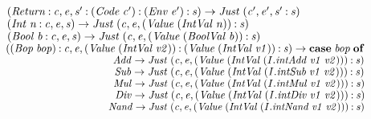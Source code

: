 \documentclass[10pt]{article}
\newcommand{\Conid}[1]{\mathit{#1}}
\newcommand{\Varid}[1]{\mathit{#1}}
\begin{document}
\begin{hscode}
${\hskip4.00em\relax(\Conid{Return}\mathbin{:}\Varid{c},\Varid{e},\Varid{s'}\mathbin{:}(\Conid{Code}\;\Varid{c'})\mathbin{:}(\Conid{Env}\;\Varid{e'})\mathbin{:}\Varid{s})\to \Conid{Just}\;(\Varid{c'},\Varid{e'},\Varid{s'}\mathbin{:}\Varid{s})}$\\
${\hskip4.00em\relax(\Conid{Int}\;\Varid{n}\mathbin{:}\Varid{c},\Varid{e},\Varid{s})\to \Conid{Just}\;(\Varid{c},\Varid{e},(\Conid{Value}\;(\Conid{IntVal}\;\Varid{n}))\mathbin{:}\Varid{s})}$\\
${\hskip4.00em\relax(\Conid{Bool}\;\Varid{b}\mathbin{:}\Varid{c},\Varid{e},\Varid{s})\to \Conid{Just}\;(\Varid{c},\Varid{e},(\Conid{Value}\;(\Conid{BoolVal}\;\Varid{b}))\mathbin{:}\Varid{s})}$\\
${\hskip4.00em\relax((\Conid{Bop}\;\Varid{bop})\mathbin{:}\Varid{c},\Varid{e},(\Conid{Value}\;(\Conid{IntVal}\;\Varid{v2}))\mathbin{:}(\Conid{Value}\;(\Conid{IntVal}\;\Varid{v1}))\mathbin{:}\Varid{s})\to \mathbf{case}\;\Varid{bop}\;\mathbf{of}}$\\
${\hskip4.00em\relax\phantom{((\Conid{Bop}\;\Varid{bop})\mathbin{:}\Varid{c},\Varid{e},(\Conid{Value}\;\mbox{}}\Conid{Add}\to \Conid{Just}\;(\Varid{c},\Varid{e},(\Conid{Value}\;(\Conid{IntVal}\;(\Varid{\Conid{I}.intAdd}\;\Varid{v1}\;\Varid{v2})))\mathbin{:}\Varid{s})}$\\
${\hskip4.00em\relax\phantom{((\Conid{Bop}\;\Varid{bop})\mathbin{:}\Varid{c},\Varid{e},(\Conid{Value}\;\mbox{}}\Conid{Sub}\to \Conid{Just}\;(\Varid{c},\Varid{e},(\Conid{Value}\;(\Conid{IntVal}\;(\Varid{\Conid{I}.intSub}\;\Varid{v1}\;\Varid{v2})))\mathbin{:}\Varid{s})}$\\
${\hskip4.00em\relax\phantom{((\Conid{Bop}\;\Varid{bop})\mathbin{:}\Varid{c},\Varid{e},(\Conid{Value}\;\mbox{}}\Conid{Mul}\to \Conid{Just}\;(\Varid{c},\Varid{e},(\Conid{Value}\;(\Conid{IntVal}\;(\Varid{\Conid{I}.intMul}\;\Varid{v1}\;\Varid{v2})))\mathbin{:}\Varid{s})}$\\
${\hskip4.00em\relax\phantom{((\Conid{Bop}\;\Varid{bop})\mathbin{:}\Varid{c},\Varid{e},(\Conid{Value}\;\mbox{}}\Conid{Div}\to \Conid{Just}\;(\Varid{c},\Varid{e},(\Conid{Value}\;(\Conid{IntVal}\;(\Varid{\Conid{I}.intDiv}\;\Varid{v1}\;\Varid{v2})))\mathbin{:}\Varid{s})}$\\
${\hskip4.00em\relax\phantom{((\Conid{Bop}\;\Varid{bop})\mathbin{:}\Varid{c},\Varid{e},(\Conid{Value}\;\mbox{}}\Conid{Nand}\to \Conid{Just}\;(\Varid{c},\Varid{e},(\Conid{Value}\;(\Conid{IntVal}\;(\Varid{\Conid{I}.intNand}\;\Varid{v1}\;\Varid{v2})))\mathbin{:}\Varid{s})}$\\

\end{hscode}
\end{document}
